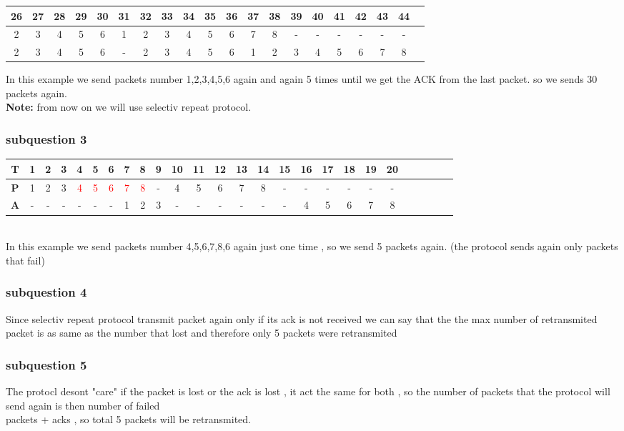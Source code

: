 \documentclass{article}
\begin{document}
        \begin{tabular}{|c|c|c|c|c|c|c|c|c|c|c|c|c|c|c|c|c|c|c|c|}
            \hline
             26 & 27 & 28 & 29 & 30 & 31 & 32 & 33 & 34 & 35 & 36 & 37 & 38 & 39 & 40 & 41 & 42 & 43 & 44 \\
            \hline
            2 & 3 & 4 & 5 & 6 & 1 & 2 & 3 & 4 & 5 & 6 & 7 & 8 & - & - & - & - & - & -\\
            \hline
            2 & 3 & 4 & 5 & 6 & - & 2 & 3 & 4 & 5 & 6 & 1 & 2 & 3 & 4 & 5 & 6 & 7 & 8 \\
            \hline
        \end{tabular}
        In this example we send packets number 1,2,3,4,5,6 again and again 5 times until we get the ACK from the last packet. so we sends 30 packets again.\\

        \textbf{Note:} from now on we will use selectiv repeat protocol.\\
        \subsubsection{subquestion 3}
        \begin{tabular}{|c|c|c|c|c|c|c|c|c|c|c|c|c|c|c|c|c|c|c|c|c|c|c|c|c|c|}
            \hline
            \textbf{T} & 1 & 2 & 3 & 4 & {5} & 6 & 7 & 8 & 9 & {10} & 11 & 12 & 13 & 14 & {15} & 16 & 17 & 18 & 19 & {20}   \\
            \hline
            \textbf{P} & 1 & 2 & 3 & \textcolor{red}4 & \textcolor{red}5 & \textcolor{red}6  & \textcolor{red}7 & \textcolor{red}8 & - & 4 & 5 & 6 & 7 & 8 & -  & - & - & - & - & -\\
            \hline
            \textbf{A} & - & - & - & - & - & - & 1 & 2 & 3 & - & - & - & - & - & - & 4 & 5 & 6 & 7 & 8\\
            \hline
        \end{tabular}\\
        In this example we send packets number 4,5,6,7,8,6 again just one time , so we send 5 packets again. (the protocol sends again only packets that fail)\\
        
        \subsubsection{subquestion 4}
        Since selectiv repeat protocol transmit packet again only if its ack is not received we can say that the the max number of retransmited packet is as same as the number that lost and therefore only 5 packets were retransmited
        \subsubsection{subquestion 5}
        The protocl desont "care" if the packet is lost or the ack is lost , it act the same for both , so the number of packets that the protocol will send again is then number of failed\\
        packets + acks , so total 5 packets will be retransmited.
        
\end{document}
